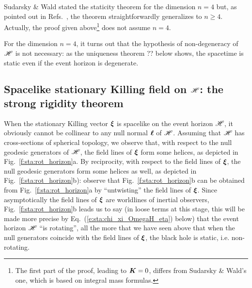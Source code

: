 \begin{remark}
Sudarsky \& Wald stated the staticity theorem for the dimension $n=4$ but, as pointed out in
Refs.~\cite{Chrus05,ChrusLH12,HollaI12}, the theorem straightforwardly generalizes
to $n \geq 4$. Actually, the proof given above\footnote{The first part of the proof,
leading to $\bm{K} = 0$, differs from Sudarsky \& Wald's one, which is based on integral
mass formulas.}
does not assume $n=4$.
\end{remark}

\begin{remark}
For the dimension $n=4$, it turns out that the hypothesis of non-degeneracy of $\mathscr{H}$
is not necessary: as the uniqueness theorem ?? below shows,
the spacetime is static even if the event horizon is degenerate.
\end{remark}


\subsection{Spacelike stationary Killing field on $\mathscr{H}$: the strong rigidity theorem}
\label{s:sta:strong_rigidity}

When the stationary Killing vector $\bm{\xi}$ is spacelike on the event horizon $\mathscr{H}$, it obviously cannot be collinear to
any null normal $\bm{\ell}$ of $\mathscr{H}$.
Assuming that $\mathscr{H}$ has cross-sections of spherical topology, we observe
that, with respect to the null geodesic generators of $\mathscr{H}$, the field lines of $\bm{\xi}$
form some helices, as depicted in Fig.~\ref{f:sta:rot_horizon}a. By reciprocity,
with respect to the field lines of $\bm{\xi}$,
the null geodesic generators form some helices as well, as depicted in
Fig.~\ref{f:sta:rot_horizon}b):
observe that Fig.~\ref{f:sta:rot_horizon}b can be obtained from Fig.~\ref{f:sta:rot_horizon}a
by ``untwisting'' the field lines of $\bm{\xi}$.
Since asymptotically the field lines of $\bm{\xi}$ are worldlines of inertial observers,
Fig.~\ref{f:sta:rot_horizon}b leads us to say
(in loose terms at this stage, this will be made more precise by Eq.~(\ref{e:sta:chi_xi_OmegaH_eta}) below) that the event horizon $\mathscr{H}$
``is rotating'', all the more that we have seen above that when the null
generators coincide with the field lines of $\bm{\xi}$, the black hole is static, i.e. non-rotating.

